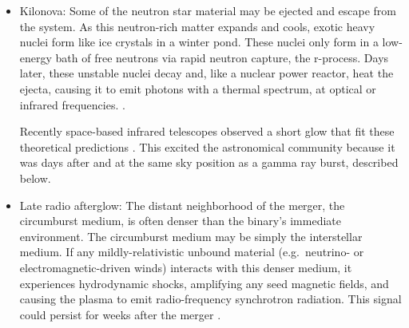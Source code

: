 \begin{itemize}
  \item Kilonova: Some of the neutron star material may be ejected and escape
    from the system. As this neutron-rich matter expands and cools, exotic heavy
    nuclei form like ice crystals in a winter pond. These nuclei only form in a
    low-energy bath of free neutrons via rapid neutron capture, the r-process.
    Days later, these unstable nuclei decay and, like a nuclear power reactor,
    heat the ejecta, causing it to emit photons with a
    thermal spectrum, at optical or infrared frequencies.
    \citep{
      li1998-transients,
      robe2011-transients,
      metz2012-most_promising,
      kase2013-opacities}.

    Recently space-based infrared telescopes observed a short glow that
    fit these theoretical predictions
    \citep{berg2013-130603B,tanv2013-130603B}. This excited the astronomical
    community because it was days after and at the same sky position as a gamma
    ray burst, described below.
  \item Late radio afterglow: The distant neighborhood of the merger, the
    circumburst medium, is often denser than the binary's immediate environment.
    The circumburst medium may be simply the interstellar medium.
    If any mildly-relativistic unbound material (e.g.\ neutrino- or
    electromagnetic-driven winds) interacts with this denser medium, it
    experiences hydrodynamic shocks, amplifying any seed magnetic fields, and
    causing the plasma to emit radio-frequency synchrotron radiation.
    This signal could persist for weeks after the merger
    \citep{naka2011-radio}.


\end{itemize}
